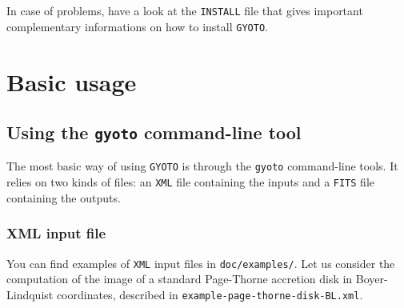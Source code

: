 \documentclass[a4paper,12pt]{article}
\begin{document}
In case of problems, have a look at the \texttt{INSTALL} file that gives important complementary informations on how to install \texttt{GYOTO}.

\section{Basic usage}
\subsection{Using the \texttt{gyoto} command-line tool}
\label{demo}

The most basic way of using \texttt{GYOTO} is through the
\texttt{gyoto} command-line tools. It relies on two kinds of files: an
\texttt{XML} file containing the inputs and a \texttt{FITS} file
containing the outputs.

\subsubsection{XML input file}

You can find examples of \texttt{XML} input files in \texttt{doc/examples/}. Let us consider the computation of the image of a standard Page-Thorne accretion disk in Boyer-Lindquist coordinates, described in \texttt{example-page-thorne-disk-BL.xml}. 
\end{document}
